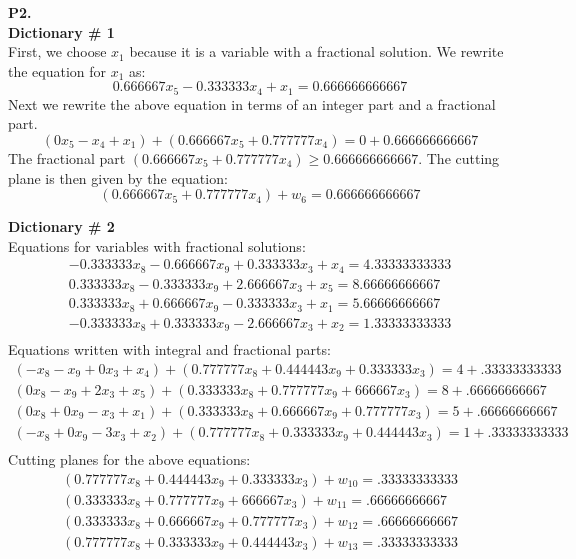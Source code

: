 \documentclass[11pt]{article}
\begin{document}
\newpage
\noindent\textbf{P2.}
\\
\noindent\textbf{Dictionary \# 1}
\\
First, we choose $x_1$ because it is a variable with a fractional solution.  We rewrite the equation for $x_1$ as:
$$
0.666667 x_{5} - 0.333333 x_{4} + x_1 = 0.666666666667
$$
Next we rewrite the above equation in terms of an integer part and a fractional part.
$$
(0x_5 - x_4 + x_1) + (0.666667 x_{5} + 0.777777 x_{4}) = 0 + 0.666666666667
$$
The fractional part $(0.666667 x_{5} + 0.777777 x_{4}) \geq 0.666666666667$.
The cutting plane is then given by the equation:
$$
(0.666667 x_{5} + 0.777777 x_{4}) + w_6 = 0.666666666667
$$

\noindent\textbf{Dictionary \# 2} 
\\
Equations for variables with fractional solutions:
\begin{align*}
-0.333333 x_{8} - 0.666667 x_{9} + 0.333333 x_{3} + x_{4} = 4.33333333333 \\
0.333333 x_{8} - 0.333333 x_{9} + 2.666667 x_{3} + x_{5} = 8.66666666667 \\
0.333333 x_{8} + 0.666667 x_{9} - 0.333333 x_{3} + x_{1} = 5.66666666667 \\
-0.333333 x_{8} + 0.333333 x_{9} - 2.666667 x_{3} + x_{2} = 1.33333333333 \\
\end{align*}
Equations written with integral and fractional parts:
\begin{align*}
(-x_8 - x_9 +0x_3 + x_4) + (0.777777 x_{8} + 0.444443 x_9 + 0.333333 x_{3}) = 4 + .33333333333 \\
(0x_8 - x_9 + 2x_3 +x_5) + (0.333333 x_{8} + 0.777777 x_{9} + 666667 x_{3}) = 8 + .66666666667 \\
(0x_8 + 0x_9 - x_3 + x_1) + (0.333333 x_{8} + 0.666667 x_{9} + 0.777777 x_{3}) = 5 + .66666666667 \\
(-x_8 + 0x_9 -3x_3 + x_2) + (0.777777 x_{8} + 0.333333 x_{9} + 0.444443 x_{3}) = 1 + .33333333333 \\
\end{align*}
Cutting planes for the above equations:
\begin{align*}
(0.777777 x_{8} + 0.444443 x_9 + 0.333333 x_{3}) + w_{10}= .33333333333 \\
(0.333333 x_{8} + 0.777777 x_{9} + 666667 x_{3}) + w_{11}= .66666666667 \\
(0.333333 x_{8} + 0.666667 x_{9} + 0.777777 x_{3}) + w_{12}= .66666666667 \\
(0.777777 x_{8} + 0.333333 x_{9} + 0.444443 x_{3}) + w_{13}= .33333333333 \\
\end{align*}
\end{document}
